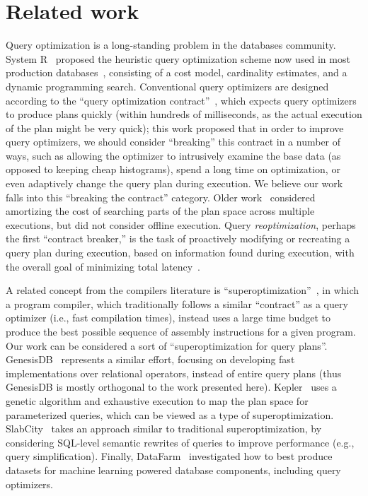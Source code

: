 \section{Related work}
Query optimization is a long-standing problem in the databases community. System R~\cite{system_r} proposed the heuristic query optimization scheme now used in most production databases~\cite{cascades}, consisting of a cost model, cardinality estimates, and a dynamic programming search.
Conventional query optimizers are designed according to the ``query optimization contract''~\cite{chaudhuri2009_rethinking_qo}, which expects query optimizers to produce plans quickly (within hundreds of milliseconds, as the actual execution of the plan might be very quick); this work proposed that in order to improve query optimizers, we should consider ``breaking'' this contract in a number of ways, such as allowing the optimizer to intrusively examine the base data (as opposed to keeping cheap histograms), spend a long time on optimization, or even adaptively change the query plan during execution. We believe our work falls into this ``breaking the contract'' category. Older work~\cite{fittest_qo} considered amortizing the cost of searching parts of the plan space across multiple executions, but did not consider offline execution. Query \emph{reoptimization}, perhaps the first ``contract breaker,'' is the task of proactively modifying or recreating a query plan during execution, based on information found during execution, with the overall goal of minimizing total latency~\cite{reopt,rio_reopt,inc_reopt}.


A related concept from the compilers literature is ``superoptimization''~\cite{superopt_coined}, in which a program compiler, which traditionally follows a similar ``contract'' as a query optimizer (i.e., fast compilation times), instead uses a large time budget to produce the best possible sequence of assembly instructions for a given program. Our work can be considered a sort of ``superoptimization for query plans''. GenesisDB~\cite{genesisdb} represents a similar effort, focusing on developing fast implementations over relational operators, instead of entire query plans (thus GenesisDB is mostly orthogonal to the work presented here). Kepler~\cite{kepler} uses a genetic algorithm and exhaustive execution to map the plan space for parameterized queries, which can be viewed as a type of superoptimization. SlabCity~\cite{slabcity} takes an approach similar to traditional superoptimization, by considering SQL-level semantic rewrites of queries to improve performance (e.g., query simplification). Finally, DataFarm~\cite{datafarm}  investigated how to best produce datasets for machine learning powered database components, including query optimizers.

